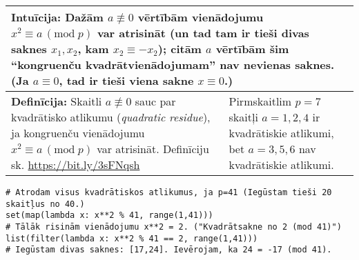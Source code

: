 \documentclass[a4paper]{article}
\begin{document}
\vspace{-10pt}
\renewcommand{\arraystretch}{1.2}
\begin{table}[ht!]\centering
{\small
\begin{tabular*}{18.46cm}{@{}|p{10.35cm}|p{7.25cm}|@{}} \hline
\multicolumn{2}{|p{18.05cm}|}{
\cellcolor[HTML]{E1FFE1}
Intuīcija: Dažām $a\not\equiv 0$ vērtībām vienādojumu $x^2 \equiv a\,(\text{mod}\;p)$ var 
atrisināt (un tad tam ir tieši divas saknes $x_1, x_2$, kam $x_2 \equiv - x_2$); citām $a$ vērtībām
šim ``kongruenču kvadrātvienādojumam'' nav nevienas saknes.\newline 
(Ja $a \equiv 0$, tad ir tieši viena sakne $x \equiv 0$.)
} \\ \hline
{\bf Definīcija:} Skaitli $a\not\equiv 0$ sauc par kvadrātisko atlikumu ({\em quadratic residue}), ja 
kongruenču vienādojumu $x^2 \equiv a\,(\text{mod}\;p)$ var atrisināt.\newline
Definīciju sk. \url{https://bit.ly/3sFNqsh}
 &
Pirmskaitlim $p=7$ skaitļi $a=1,2,4$ ir kvadrātiskie atlikumi, 
bet $a = 3,5,6$ nav kvadrātiskie atlikumi.  \\ \hline
\end{tabular*}
}
\end{table}

{\small
\vspace{-10pt}
\begin{Verbatim}
# Atrodam visus kvadrātiskos atlikumus, ja p=41 (Iegūstam tieši 20 skaitļus no 40.)
set(map(lambda x: x**2 % 41, range(1,41)))
# Tālāk risinām vienādojumu x**2 = 2. ("Kvadrātsakne no 2 (mod 41)")
list(filter(lambda x: x**2 % 41 == 2, range(1,41)))
# Iegūstam divas saknes: [17,24]. Ievērojam, ka 24 = -17 (mod 41).
\end{Verbatim}
}
\end{document}
